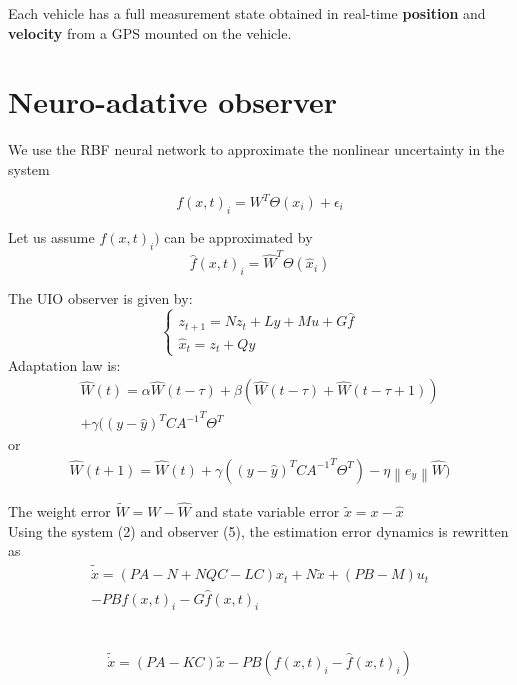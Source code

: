 \documentclass[letterpaper, 10pt, conference]{ieeeconf}  %
\begin{document}
Each vehicle has a full measurement state obtained in real-time \textbf{position} and \textbf{velocity} from a GPS mounted on the vehicle. 

\section{Neuro-adative observer}
We use the RBF neural network to approximate the nonlinear uncertainty in the system

\begin{equation}
    f(x,t)_i = W^T\Theta({x}_i) + \epsilon_i
\end{equation}

Let us assume $f(x,t)_i)$ can be approximated by
\begin{equation}
    \hat{f}(x,t)_i = \hat{W}^T\Theta(\hat{x}_i) 
\end{equation}


The UIO observer is given by: 
\begin{equation}\label{UIO}
    \left\{ \begin{array}{l}
        z_{t+1} = {N}z_{t}+ {L}y + {M}u + G\hat{f}\\ 
         \hat{x}_{t} = z_{t} + Qy
     \end{array}\right.
\end{equation}
Adaptation law is: 
\begin{align}
    \hat{W}(t) = \alpha \hat{W}(t-\tau) + \beta( \hat{W}(t-\tau) + \hat{W}(t-\tau + 1)) \\+\gamma((y - \hat{y})^T C {A^{-1}}^T \Theta^T  
\end{align}
or
\begin{align}
    \hat{W}(t+1) = \hat{W}(t) + \gamma((y - \hat{y})^T C {A^{-1}}^T \Theta^T ) - \eta \left\| e_y\right\| \hat{W} )  
\end{align}

The weight error $\tilde{W} = W - \hat{W}$ and state variable error $\tilde{x} = x-\hat{x}$
\\
Using the system (2) and observer (5), the estimation error dynamics is rewritten as
\\
\begin{align}
     \tilde{\dot{x}} = (PA - N + NQC - LC)x_t + N \tilde{x} + (PB - M)u_t \\- PB f(x,t)_i - G \hat{f}(x,t)_i 
\end{align}
   
\\
\begin{align}
     \tilde{\dot{x}} = (PA -KC)\tilde{x} - PB( f(x,t)_i-\hat{f}(x,t)_i )
\end{align}
\end{document}
